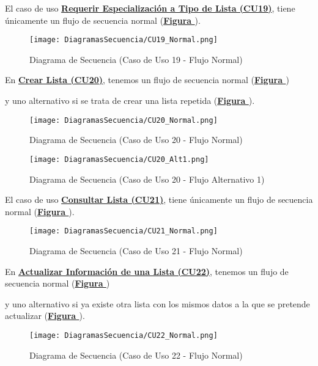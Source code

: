 \addtocounter{figura}{1}
El caso de uso \textbf{\hyperref[tab:curRequerirEspecTipoLst]{Requerir Especialización a Tipo de Lista (CU19)}}, tiene únicamente un flujo de secuencia normal (\textbf{\hyperref[fig:Secuencia_CU19_Normal]{Figura }}).
\begin{figure}[!htbp]
  \centering
  \texttt{[image: DiagramasSecuencia/CU19\_Normal.png]}
  \caption{Diagrama de Secuencia (Caso de Uso 19 - Flujo Normal)}
  \label{fig:Secuencia_CU19_Normal}
\end{figure}
\FloatBarrier

\addtocounter{figura}{1} \pagebreak
En \textbf{\hyperref[tab:curCrearLista]{Crear Lista (CU20)}}, tenemos un flujo de secuencia normal (\textbf{\hyperref[fig:Secuencia_CU20_Normal]{Figura }}) \addtocounter{figura}{1} y uno alternativo si se trata de crear una lista repetida (\textbf{\hyperref[fig:Secuencia_CU20_Alt1]{Figura }}).
\begin{figure}[!htbp]
  \centering
  \texttt{[image: DiagramasSecuencia/CU20\_Normal.png]}
  \caption{Diagrama de Secuencia (Caso de Uso 20 - Flujo Normal)}
  \label{fig:Secuencia_CU20_Normal}
\end{figure}
\FloatBarrier

\begin{figure}[!htbp]
  \centering
  \texttt{[image: DiagramasSecuencia/CU20\_Alt1.png]}
  \caption{Diagrama de Secuencia (Caso de Uso 20 - Flujo Alternativo 1)}
  \label{fig:Secuencia_CU20_Alt1}
\end{figure}
\FloatBarrier

\addtocounter{figura}{1} \pagebreak
El caso de uso \textbf{\hyperref[tab:curConsultarLista]{Consultar Lista (CU21)}}, tiene únicamente un flujo de secuencia normal (\textbf{\hyperref[fig:Secuencia_CU21_Normal]{Figura }}).
\begin{figure}[!htbp]
  \centering
  \texttt{[image: DiagramasSecuencia/CU21\_Normal.png]}
  \caption{Diagrama de Secuencia (Caso de Uso 21 - Flujo Normal)}
  \label{fig:Secuencia_CU21_Normal}
\end{figure}
\FloatBarrier

\addtocounter{figura}{1}
En \textbf{\hyperref[tab:curActualizarLista]{Actualizar Información de una Lista (CU22)}}, tenemos un flujo de secuencia normal (\textbf{\hyperref[fig:Secuencia_CU22_Normal]{Figura }}) \addtocounter{figura}{1} y uno alternativo si ya existe otra lista con los mismos datos a la que se pretende actualizar (\textbf{\hyperref[fig:Secuencia_CU22_Alt1]{Figura }}).
\begin{figure}[!htbp]
  \centering
  \texttt{[image: DiagramasSecuencia/CU22\_Normal.png]}
  \caption{Diagrama de Secuencia (Caso de Uso 22 - Flujo Normal)}
  \label{fig:Secuencia_CU22_Normal}
\end{figure}
\FloatBarrier

